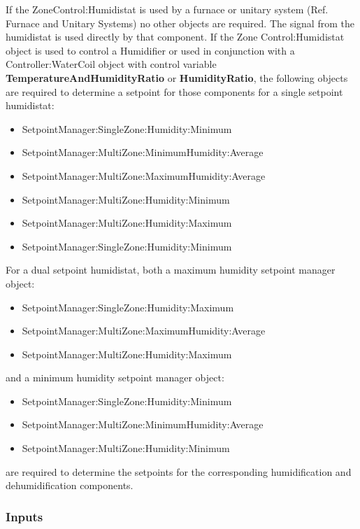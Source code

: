 If the ZoneControl:Humidistat is used by a furnace or unitary system (Ref. Furnace and Unitary Systems) no other objects are required. The signal from the humidistat is used directly by that component. If the Zone Control:Humidistat object is used to control a Humidifier or used in conjunction with a Controller:WaterCoil object with control variable \textbf{TemperatureAndHumidityRatio} or \textbf{HumidityRatio}, the following objects are required to determine a setpoint for those components for a single setpoint humidistat:

\begin{itemize}
\item
  SetpointManager:SingleZone:Humidity:Minimum
\item
  SetpointManager:MultiZone:MinimumHumidity:Average
\item
  SetpointManager:MultiZone:MaximumHumidity:Average
\item
  SetpointManager:MultiZone:Humidity:Minimum
\item
  SetpointManager:MultiZone:Humidity:Maximum
\item
  SetpointManager:SingleZone:Humidity:Minimum
\end{itemize}

For a dual setpoint humidistat, both a maximum humidity setpoint manager object:

\begin{itemize}
\item
  SetpointManager:SingleZone:Humidity:Maximum
\item
  SetpointManager:MultiZone:MaximumHumidity:Average
\item
  SetpointManager:MultiZone:Humidity:Maximum
\end{itemize}

and a minimum humidity setpoint manager object:

\begin{itemize}
\item
  SetpointManager:SingleZone:Humidity:Minimum
\item
  SetpointManager:MultiZone:MinimumHumidity:Average
\item
  SetpointManager:MultiZone:Humidity:Minimum
\end{itemize}

are required to determine the setpoints for the corresponding humidification and dehumidification components.

\subsubsection{Inputs}\label{inputs-8-028}

